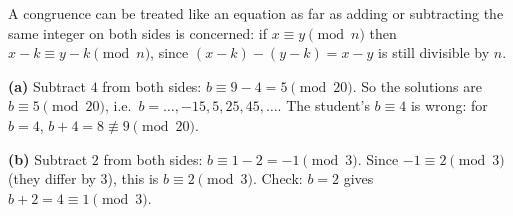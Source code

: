 A congruence can be treated like an equation as far as adding or subtracting the same integer on both sides is concerned: if $x\equiv y\pmod n$ then $x-k\equiv y-k\pmod n$, since $(x-k)-(y-k)=x-y$ is still divisible by $n$.

\textbf{(a)} Subtract $4$ from both sides: $b\equiv9-4=5\pmod{20}$. So the solutions are $\boxed{b\equiv5\pmod{20}}$, i.e.\ $b=\dots,-15,5,25,45,\dots$. The student's $b\equiv4$ is wrong: for $b=4$, $b+4=8\not\equiv9\pmod{20}$.

\textbf{(b)} Subtract $2$ from both sides: $b\equiv1-2=-1\pmod3$. Since $-1\equiv2\pmod3$ (they differ by $3$), this is $\boxed{b\equiv2\pmod3}$. Check: $b=2$ gives $b+2=4\equiv1\pmod3$.
